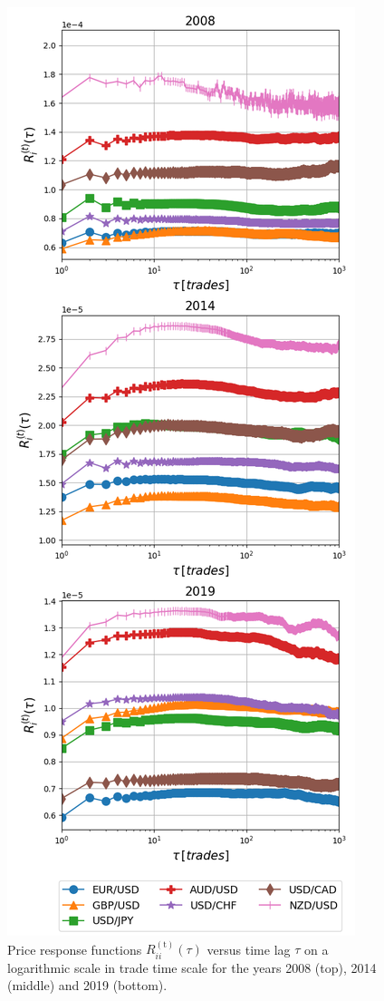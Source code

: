 \begin{figure}[htbp]
    \centering
    \includegraphics[width=\columnwidth]
    {figures/04_responses_trade_scale.png}
    \caption{Price response functions
             $R^{\left(\textrm{t}\right)}_{ii}\left(\tau\right)$ versus time
             lag $\tau$ on a logarithmic scale in trade time scale for the
             years 2008 (top), 2014 (middle) and 2019 (bottom).}
    \label{fig:response_function_trade_scale}
\end{figure}

